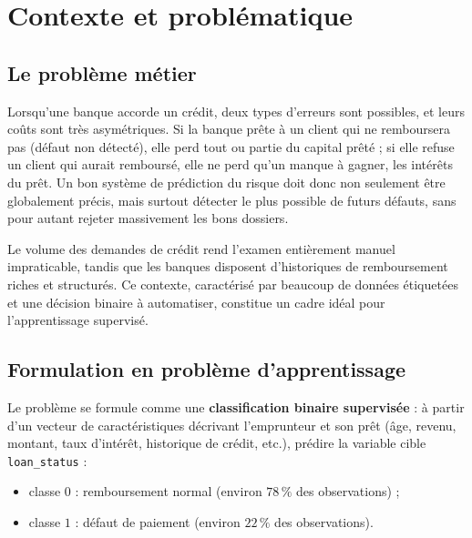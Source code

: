 
\section{Contexte et problématique}
\label{sec:contexte}

\subsection{Le problème métier}

Lorsqu'une banque accorde un crédit, deux types d'erreurs sont possibles, et
leurs coûts sont très asymétriques. Si la banque prête à un client qui ne
remboursera pas (défaut non détecté), elle perd tout ou partie du capital
prêté ; si elle refuse un client qui aurait remboursé, elle ne perd qu'un manque
à gagner, les intérêts du prêt. Un bon système de prédiction du risque doit donc
non seulement être globalement précis, mais surtout détecter le plus possible de
futurs défauts, sans pour autant rejeter massivement les bons dossiers.

Le volume des demandes de crédit rend l'examen entièrement manuel impraticable,
tandis que les banques disposent d'historiques de remboursement riches et
structurés. Ce contexte, caractérisé par beaucoup de données étiquetées et une
décision binaire à automatiser, constitue un cadre idéal pour l'apprentissage
supervisé.

\subsection{Formulation en problème d'apprentissage}

Le problème se formule comme une \textbf{classification binaire supervisée} :
à partir d'un vecteur de caractéristiques décrivant l'emprunteur et son prêt
(âge, revenu, montant, taux d'intérêt, historique de crédit, etc.), prédire la
variable cible \texttt{loan\_status} :
\begin{itemize}
  \item classe $0$ : remboursement normal (environ $78\,\%$ des observations) ;
  \item classe $1$ : défaut de paiement (environ $22\,\%$ des observations).
\end{itemize}

